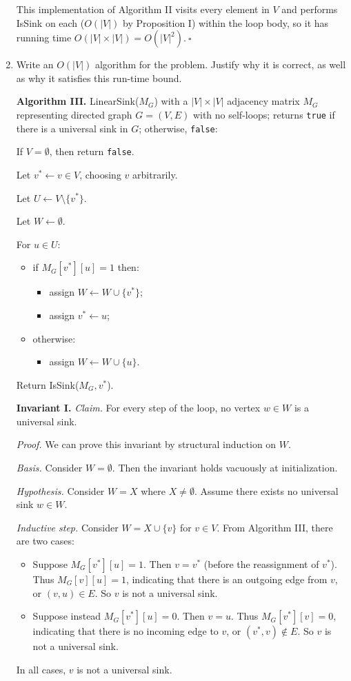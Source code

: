 \begin{enumerate}
\begin{solution}
This implementation of Algorithm II visits every element in $V$ and performs {\sc IsSink} on each ($O(|V|)$ by Proposition I) within the loop body, so it has running time $O(|V|\times |V|)=O(|V|^2).~\square$
\end{solution}
\newpage
\item Write an $O(|V|)$ algorithm for the problem. Justify why it is correct, as well as why it satisfies this run-time bound.
\begin{solution}

\textbf{Algorithm III. }{\sc LinearSink}($M_G$) with a $|V|\times |V|$ adjacency matrix $M_G$ representing directed graph $G=(V,E)$ with no self-loops; returns \verb|true| if there is a universal sink in $G$; otherwise, \verb|false|:

If $V=\emptyset$, then return \verb|false|.

Let $v^*\leftarrow v\in V$, choosing $v$ arbitrarily.

Let $U\leftarrow V\setminus\{v^*\}$.

Let $W\leftarrow\emptyset$.

For $u\in U$:
\begin{itemize}
\item if $M_G[v^*][u]=1$ then:
\begin{itemize}
    \item assign $W\leftarrow W\cup\{v^*\}$;
    \item assign $v^*\leftarrow u$;
\end{itemize}
\item otherwise:
\begin{itemize}
    \item assign $W\leftarrow W\cup\{u\}$.
\end{itemize}
\end{itemize}

Return {\sc IsSink}($M_G,v^*$).

\textbf{Invariant I. }\textit{Claim. }For every step of the loop, no vertex $w\in W$ is a universal sink.

\textit{Proof. }We can prove this invariant by structural induction on $W$.

\textit{Basis. }Consider $W=\emptyset$. Then the invariant holds vacuously at initialization.

\textit{Hypothesis. }Consider $W=X$ where $X\neq\emptyset$. Assume there exists no universal sink $w\in W$.

\textit{Inductive step. }Consider $W=X\cup\{v\}$ for $v\in V$. From Algorithm III, there are two cases:
\begin{itemize}
\item Suppose $M_G[v^*][u]=1$. Then $v=v^*$ (before the reassignment of $v^*$). Thus $M_G[v][u]=1$, indicating that there is an outgoing edge from $v$, or $(v,u)\in E$. So $v$ is not a universal sink.
\item Suppose instead $M_G[v^*][u]=0$. Then $v=u$. Thus $M_G[v^*][v]=0$, indicating that there is no incoming edge to $v$, or $(v^*,v)\notin E$. So $v$ is not a universal sink.
\end{itemize}
In all cases, $v$ is not a universal sink.


\end{solution}
\end{enumerate}
